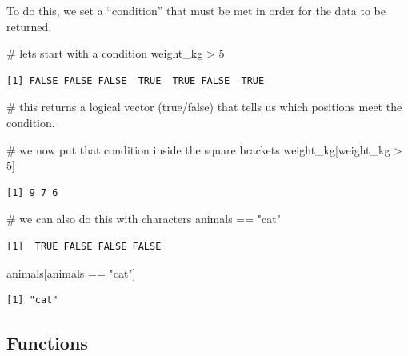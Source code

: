 \documentclass[
  letterpaper,
  DIV=11,
  numbers=noendperiod]{scrartcl}
\newenvironment{Shaded}{\begin{snugshade}}{\end{snugshade}}
\newcommand{\CommentTok}[1]{\textcolor[rgb]{0.37,0.37,0.37}{#1}}
\newcommand{\DecValTok}[1]{\textcolor[rgb]{0.68,0.00,0.00}{#1}}
\newcommand{\NormalTok}[1]{\textcolor[rgb]{0.00,0.23,0.31}{#1}}
\newcommand{\SpecialCharTok}[1]{\textcolor[rgb]{0.37,0.37,0.37}{#1}}
\newcommand{\StringTok}[1]{\textcolor[rgb]{0.13,0.47,0.30}{#1}}
\begin{document}
To do this, we set a ``condition'' that must be met in order for the
data to be returned.

\begin{Shaded}
\begin{Highlighting}[]
\CommentTok{\# let\textquotesingle{}s start with a condition}
\NormalTok{weight\_kg }\SpecialCharTok{\textgreater{}} \DecValTok{5}
\end{Highlighting}
\end{Shaded}

\begin{verbatim}
[1] FALSE FALSE FALSE  TRUE  TRUE FALSE  TRUE
\end{verbatim}

\begin{Shaded}
\begin{Highlighting}[]
\CommentTok{\# this returns a logical vector (true/false) that tells us which positions meet the condition.}

\CommentTok{\# we now put that condition inside the square brackets}
\NormalTok{weight\_kg[weight\_kg }\SpecialCharTok{\textgreater{}} \DecValTok{5}\NormalTok{]}
\end{Highlighting}
\end{Shaded}

\begin{verbatim}
[1] 9 7 6
\end{verbatim}

\begin{Shaded}
\begin{Highlighting}[]
\CommentTok{\# we can also do this with characters}
\NormalTok{animals }\SpecialCharTok{==} \StringTok{"cat"}
\end{Highlighting}
\end{Shaded}

\begin{verbatim}
[1]  TRUE FALSE FALSE FALSE
\end{verbatim}

\begin{Shaded}
\begin{Highlighting}[]
\NormalTok{animals[animals }\SpecialCharTok{==} \StringTok{"cat"}\NormalTok{]}
\end{Highlighting}
\end{Shaded}

\begin{verbatim}
[1] "cat"
\end{verbatim}

\subsection{Functions}\label{functions}
\end{document}
